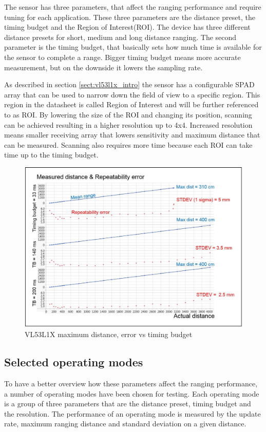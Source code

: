 The sensor has three parameters, that affect the ranging performance and require tuning for each application. 
These three parameters are the distance preset, the timing budget and the Region of Interest(ROI). The device 
has three different distance presets for short, medium and long distance ranging. The second parameter is the
timing budget, that basically sets how much time is available for the sensor to complete a range. Bigger 
timing budget means more accurate measurement, but on the downside it lowers the sampling rate.

As described in section \ref{sect:vl53l1x_intro} the sensor has a configurable SPAD array that can be used to 
narrow down the field of view to a specific region. This region in the datasheet is called Region of Interest
and will be further referenced to as ROI. By lowering the size of the ROI and changing its position, scanning 
can be achieved resulting in a higher resolution up to 4x4. Increased resolution means smaller receiving array 
that lowers sensitivity and maximum distance that can be measured. Scanning also requires more time because 
each ROI can take time up to the timing budget.

\begin{figure}[!ht]
    \centering
    \includegraphics[width=140mm, keepaspectratio]{figures/vl53l1x_timing_budget.png}
    \caption{VL53L1X maximum distance, error vs timing budget \cite{VL53L1XDatasheet}}
    \label{fig:vl53l1x_timing_budget}
\end{figure}

\subsection{Selected operating modes}
To have a better overview how these parameters affect the ranging performance, a number of operating modes 
have been chosen for testing. Each operating mode is a group of three parameters that are the distance preset,
timing budget and the resolution. The performance of an operating mode is measured by the update rate, maximum 
ranging distance and standard deviation on a given distance.

